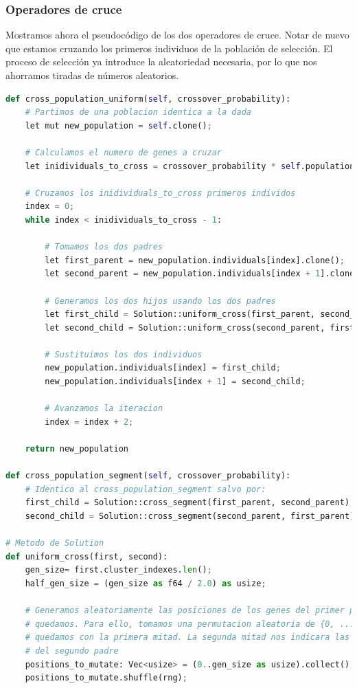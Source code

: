 \documentclass[11pt]{article}
\begin{document}
\subsubsection{Operadores de cruce}

Mostramos ahora el pseudocódigo de los dos operadores de cruce. Notar de nuevo que estamos cruzando los primeros individuos de la población de selección. El proceso de selección ya introduce la aleatoriedad necesaria, por lo que nos ahorramos tiradas de números aleatorios.

\begin{lstlisting}[language=Python, style=Boxed]
def cross_population_uniform(self, crossover_probability):
    # Partimos de una poblacion identica a la dada
    let mut new_population = self.clone();

    # Calculamos el numero de genes a cruzar
    let inidividuals_to_cross = crossover_probability * self.population_size()

    # Cruzamos los inidividuals_to_cross primeros individos
    index = 0;
    while index < inidividuals_to_cross - 1:

        # Tomamos los dos padres
        let first_parent = new_population.individuals[index].clone();
        let second_parent = new_population.individuals[index + 1].clone();

        # Generamos los dos hijos usando los dos padres
        let first_child = Solution::uniform_cross(first_parent, second_parent);
        let second_child = Solution::uniform_cross(second_parent, first_parent);

        # Sustituimos los dos individuos
        new_population.individuals[index] = first_child;
        new_population.individuals[index + 1] = second_child;

        # Avanzamos la iteracion
        index = index + 2;

    return new_population

def cross_population_segment(self, crossover_probability):
    # Identico al cross_population_segment salvo por:
    first_child = Solution::cross_segment(first_parent, second_parent);
    second_child = Solution::cross_segment(second_parent, first_parent);

# Metodo de Solution
def uniform_cross(first, second):
    gen_size= first.cluster_indexes.len();
    half_gen_size = (gen_size as f64 / 2.0) as usize;

    # Generamos aleatoriamente las posiciones de los genes del primer padre con las que nos
    # quedamos. Para ello, tomamos una permutacion aleatoria de {0, ..., gen_size - 1} y nos
    # quedamos con la primera mitad. La segunda mitad nos indicara las posiciones que usamos
    # del segundo padre
    positions_to_mutate: Vec<usize> = (0..gen_size as usize).collect();
    positions_to_mutate.shuffle(rng);


\end{lstlisting}
\end{document}
